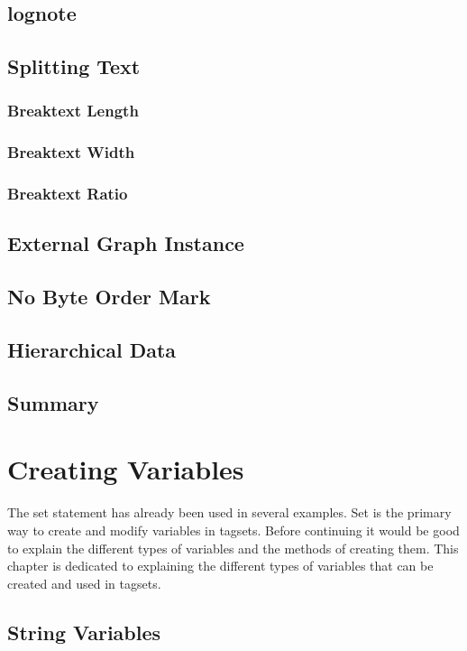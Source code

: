 \documentclass{book}
\begin{document}
\section{lognote}

\section{Splitting Text}

\subsection{Breaktext Length}

\subsection{Breaktext Width}

\subsection{Breaktext Ratio}

\section{External Graph Instance}

\section{No Byte Order Mark}

\section{Hierarchical Data}

\section{Summary}

\chapter{Creating Variables}
The set statement has already been used in several examples. 
Set is the primary way to create and modify variables in
tagsets.
Before continuing it would be good to
explain the different types of variables and the methods 
of creating them.  This chapter is dedicated to explaining
the different types of variables that can be created and 
used in tagsets.
\section{String Variables}
\end{document}
